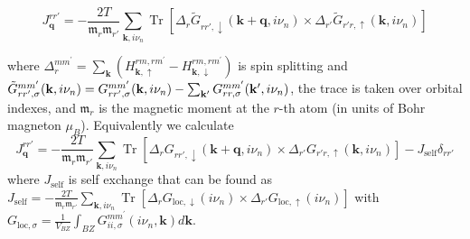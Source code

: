 \documentclass[12pt,a4paper]{article}
\begin{document}
\begin{equation}
    \label{JqDFT}
    J^{rr'}_{\mathbf{q}}=  -\frac{2T}{{\mathfrak m}_r{\mathfrak m}_{r'}}  \sum_{{\mathbf k},i \nu_n}\operatorname{Tr}
    \left[\Delta_{ r} \tilde{G}_{ rr',\downarrow}({\mathbf k}+ {\mathbf q},i \nu_n)\right. \times \left.\Delta_{r'} \tilde{G}_{r'r,\uparrow}({\mathbf k},i \nu_n) \right]
\end{equation}

where $\Delta_{r}^{m m^{\prime}} = \sum_{\mathbf k}(H_{\mathbf{k},\uparrow }^{rm, rm^{\prime}}-H_{\mathbf{k},\downarrow}^{rm, rm^{\prime}})$ is spin splitting 
and $\tilde{G}^{mm'}_{ rr',\sigma}({\bf k},i \nu_n)={G}^{mm'}_{ rr',\sigma}({\bf k},i \nu_n)-
\sum_{{\mathbf k}'} G_{rr, \sigma }^{m m^{\prime}}(\mathbf{k}',i \nu_n)$, the trace is taken over orbital indexes, and $\mathfrak{m}_r$ is the magnetic moment at the $r$-th atom (in units of Bohr magneton $\mu_B$). 
Equivalently we calculate 
\begin{equation}
    J^{rr'}_{\mathbf{q}}=  -\frac{2T}{{\mathfrak m}_r{\mathfrak m}_{r'}}  \sum_{{\mathbf k},i \nu_n}\operatorname{Tr}
    \left[\Delta_{ r} G_{ rr',\downarrow}({\mathbf k}+ {\mathbf q},i \nu_n)\right. \times \left.\Delta_{r'} G_{r'r,\uparrow}({\mathbf k},i \nu_n) \right] - J_{\text{self}} \delta_{rr'}
\end{equation}
where $J_{\text{self}}$ is self exchange that can be found as $J_{\text{self}} = -\frac{2T}{{\mathfrak m}_r{\mathfrak m}_{r'}}  \sum_{{\mathbf k},i \nu_n}\operatorname{Tr}
\left[\Delta_{ r} G_{ \text{loc},\downarrow}(i \nu_n)\right. \times \left.\Delta_{r'} G_{\text{loc},\uparrow}(i \nu_n) \right]$ 
with $G_{\text{loc}, \sigma} = \frac{1}{V_{BZ}} \int_{B Z} G_{i i, \sigma }^{m m^{\prime}}(i \nu_n, \mathbf{k})  d \mathbf{k}$.



\end{document}
